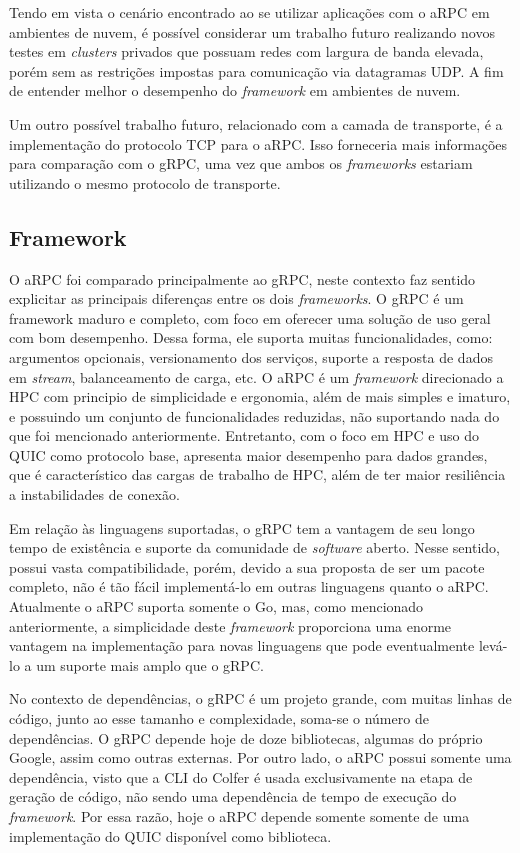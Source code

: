 Tendo em vista o cenário encontrado ao se utilizar aplicações com o aRPC em ambientes de nuvem, é possível considerar um trabalho futuro realizando novos testes em \textit{clusters} privados que possuam redes com largura de banda elevada, porém sem as restrições impostas para comunicação via datagramas UDP. A fim de entender melhor o desempenho do \textit{framework} em ambientes de nuvem.

Um outro possível trabalho futuro, relacionado com a camada de transporte, é a implementação do protocolo TCP para o aRPC. Isso forneceria mais informações para comparação com o gRPC, uma vez que ambos os \textit{frameworks} estariam utilizando o mesmo protocolo de transporte.


\subsection{Framework}

O aRPC foi comparado principalmente ao gRPC, neste contexto faz sentido explicitar as principais diferenças entre os dois \textit{frameworks}. O gRPC é um framework maduro e completo, com foco em oferecer uma solução de uso geral com bom desempenho. Dessa forma, ele suporta muitas funcionalidades, como: argumentos opcionais, versionamento dos serviços, suporte a resposta de dados em \textit{stream}, balanceamento de carga, etc. O aRPC é um \textit{framework} direcionado a HPC com principio de simplicidade e ergonomia, além de mais simples e imaturo, e possuindo um conjunto de funcionalidades reduzidas, não suportando nada do que foi mencionado anteriormente. Entretanto, com o foco em HPC e uso do QUIC como protocolo base, apresenta maior desempenho para dados grandes, que é característico das cargas de trabalho de HPC, além de ter maior resiliência a instabilidades de conexão.

Em relação às linguagens suportadas, o gRPC tem a vantagem de seu longo tempo de existência e suporte da comunidade de \textit{software} aberto. Nesse sentido, possui vasta compatibilidade, porém, devido a sua proposta de ser um pacote completo, não é tão fácil implementá-lo em outras linguagens quanto o aRPC. Atualmente o aRPC suporta somente o Go, mas, como mencionado anteriormente, a simplicidade deste \textit{framework} proporciona uma enorme vantagem na implementação para novas linguagens que pode eventualmente levá-lo a um suporte mais amplo que o gRPC.

No contexto de dependências, o gRPC é um projeto grande, com muitas linhas de código, junto ao esse tamanho e complexidade, soma-se o número de dependências. O gRPC depende hoje de doze bibliotecas, algumas do próprio Google, assim como outras externas. Por outro lado, o aRPC possui somente uma dependência, visto que a CLI do Colfer é usada exclusivamente na etapa de geração de código, não sendo uma dependência de tempo de execução do \textit{framework}. Por essa razão, hoje o aRPC depende somente somente de uma implementação do QUIC disponível como biblioteca.

